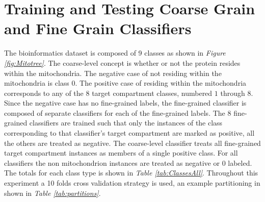 \documentclass[ms]{nuthesis}
\begin{document}
\section{Training and Testing Coarse Grain and Fine Grain Classifiers}
\par The bioinformatics dataset is composed of 9 classes as shown in
\textit{Figure \ref{fig:Mitotree}}. The coarse-level concept is whether or not
the protein resides within the mitochondria. The negative case of not residing within the mitochondria is class $0$.
The positive case of residing within the
  mitochondria corresponds to any of the $8$ target compartment classes,  numbered $1$ through $8$. Since the
  negative case has no fine-grained labels, the fine-grained classifier is composed of separate classifiers
  for each of the fine-grained labels. The $8$ fine-grained classifiers are trained such that only the instances of
  the class corresponding to that classifier's target compartment are marked as positive, all the others are treated
  as negative. The coarse-level classifier treats all fine-grained target compartment
  instances as members of a single positive class. For all classifiers the non mitochondrion instances are treated as
  negative or $0$ labeled. The totals for each class type is shown in \textit{Table \ref{tab:ClassesAll}}. Throughout
  this experiment a 10 folds cross validation strategy is used, an example partitioning in shown in
  \textit{Table \ref{tab:partitions}}.
\end{document}
